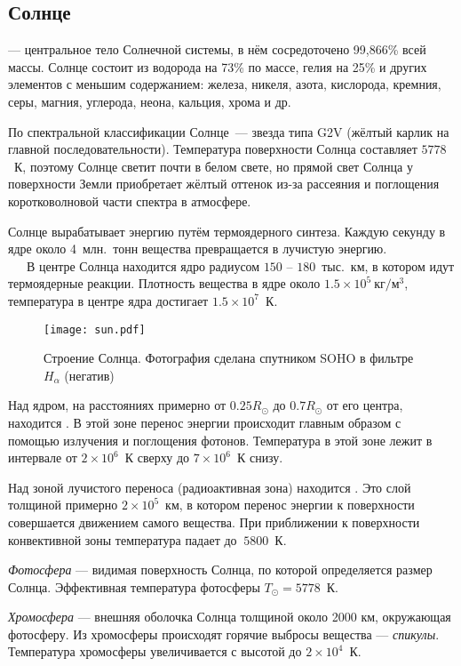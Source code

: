 \subsection{Солнце}
 --- центральное тело Солнечной системы, в нём сосредоточено 99,866\%  всей массы. Солнце состоит из водорода на 73\% по массе, гелия на 25\% и других элементов с меньшим содержанием: железа, никеля, азота, кислорода, кремния, серы, магния, углерода, неона, кальция, хрома и др.

По спектральной классификации Солнце~--- звезда типа G2V (жёлтый карлик на главной последовательности). Температура поверхности Солнца составляет $5 778$~К, поэтому Солнце светит почти в белом свете, но прямой свет Солнца у поверхности Земли приобретает жёлтый оттенок из-за рассеяния и поглощения коротковолновой части спектра в атмосфере.

Солнце вырабатывает энергию путём термоядерного синтеза. Каждую секунду в ядре около 4~млн.~тонн вещества превращается в лучистую энергию.\\

~~~В центре Солнца находится ядро радиусом $150 $ -- $ 180$~тыс.~км, в котором идут термоядерные реакции. Плотность  вещества в ядре около $1.5\times 10^5~\text{кг}/\text{м}^3$, температура в центре ядра достигает $1.5\times 10^7$~К.

\begin{figure}[h!]
\centering
\texttt{[image: sun.pdf]}
\caption{Строение Солнца. Фотография сделана спутником SOHO в фильтре $H_\alpha$ (негатив)}
\end{figure}
Над ядром, на расстояниях примерно от $0.25 R_\odot$ до $0.7R_\odot$ от его центра, находится . В этой зоне перенос энергии происходит главным образом с помощью излучения и поглощения фотонов. Температура в этой зоне лежит в интервале от $2\times10^6$~К сверху до $7\times10^6$~К снизу.

Над зоной лучистого  переноса (радиоактивная зона) находится . Это слой толщиной примерно $2\times10^5$~км, в котором перенос энергии к поверхности совершается движением самого вещества. При приближении к поверхности конвективной зоны температура падает до $~5800$~К.

\textit{Фотосфера} --- видимая поверхность Солнца, по которой определяется размер Солнца. Эффективная температура фотосферы $T_\odot =  5778$~К.

\textit{Хромосфера} --- внешняя оболочка Солнца толщиной около 2000 км, окружающая фотосферу. Из хромосферы происходят горячие  выбросы вещества --- \textit{спикулы}. Температура хромосферы увеличивается с высотой до $2\times10^4$~К.

